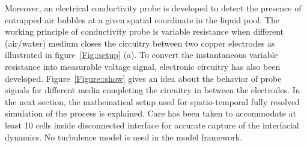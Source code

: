 Moreover, an electrical conductivity probe is developed to detect the presence of entrapped air bubbles at a given spatial coordinate in the liquid pool. The working principle of conductivity probe is variable resistance when different (air/water) medium closes the circuitry between two copper electrodes as illustrated in figure~\ref{Fig::setup} (a). To convert the instantaneous variable resistance into measurable voltage signal, electronic circuitry has also been developed. Figure~\ref{Figure::show} gives an idea about the behavior of probe signals for different media completing the circuitry in between the electrodes. In the next section, the mathematical setup used for spatio-temporal fully resolved simulation of the process is explained. Care has been taken to accommodate at least 10 cells inside disconnected interface for accurate capture of the interfacial dynamics. No turbulence model is used in the model framework.

